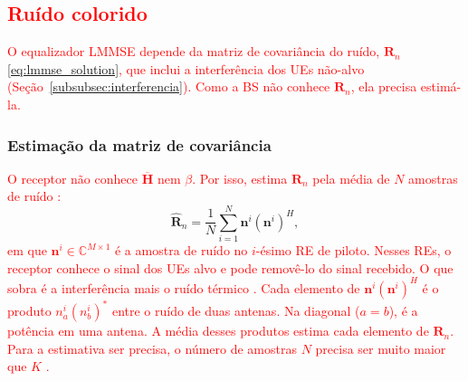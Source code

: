 \subsection{\textcolor{red}{Ruído colorido}}\label{subsec:ruido-colorido}
\textcolor{red}{O equalizador LMMSE depende da matriz de covariância do ruído, $\mathbf R_n$ \eqref{eq:lmmse_solution}, que inclui a interferência dos UEs não-alvo (Seção~\ref{subsubsec:interferencia}). Como a BS não conhece $\mathbf R_n$, ela precisa estimá-la.}

\subsubsection{Estimação da matriz de covariância}\label{subsubsec:estimacao-R}
\textcolor{red}{O receptor não conhece $\overline{\mathbf H}$ nem $\beta$. Por isso, estima $\mathbf R_n$ pela média de $N$ amostras de ruído \cite{zhao2025jsac,tomasin-interference}:}
\begin{equation}\label{eq:Rn_est}
\widehat{\mathbf R}_n=
\frac{1}{N}
\sum_{i=1}^{N}
\mathbf n^i(\mathbf n^i)^H,
\end{equation}
\textcolor{red}{em que $\mathbf n^i\in\mathbb C^{M\times1}$ é a amostra de ruído no $i$-ésimo RE de piloto. Nesses REs, o receptor conhece o sinal dos UEs alvo e pode removê-lo do sinal recebido. O que sobra é a interferência mais o ruído térmico \cite[p.~1773]{tomasin-interference}. Cada elemento de $\mathbf n^i(\mathbf n^i)^H$ é o produto $n_a^i(n_b^i)^*$ entre o ruído de duas antenas. Na diagonal ($a=b$), é a potência em uma antena. A média desses produtos estima cada elemento de $\mathbf R_n$. Para a estimativa ser precisa, o número de amostras $N$ precisa ser muito maior que $K$ \cite{zhao2025jsac}.}

